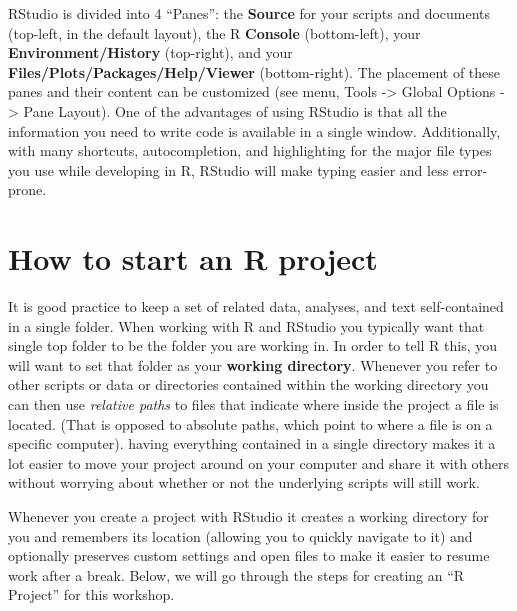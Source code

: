\documentclass[]{book}
\theoremstyle{definition}
\theoremstyle{definition}
\theoremstyle{remark}
\begin{document}
RStudio is divided into 4 ``Panes'': the \textbf{Source} for your
scripts and documents (top-left, in the default layout), the R
\textbf{Console} (bottom-left), your \textbf{Environment/History}
(top-right), and your \textbf{Files/Plots/Packages/Help/Viewer}
(bottom-right). The placement of these panes and their content can be
customized (see menu, Tools -\textgreater{} Global Options
-\textgreater{} Pane Layout). One of the advantages of using RStudio is
that all the information you need to write code is available in a single
window. Additionally, with many shortcuts, autocompletion, and
highlighting for the major file types you use while developing in R,
RStudio will make typing easier and less error-prone.

\section{How to start an R project}\label{how-to-start-an-r-project}

It is good practice to keep a set of related data, analyses, and text
self-contained in a single folder. When working with R and RStudio you
typically want that single top folder to be the folder you are working
in. In order to tell R this, you will want to set that folder as your
\textbf{working directory}. Whenever you refer to other scripts or data
or directories contained within the working directory you can then use
\emph{relative paths} to files that indicate where inside the project a
file is located. (That is opposed to absolute paths, which point to
where a file is on a specific computer). having everything contained in
a single directory makes it a lot easier to move your project around on
your computer and share it with others without worrying about whether or
not the underlying scripts will still work.

Whenever you create a project with RStudio it creates a working
directory for you and remembers its location (allowing you to quickly
navigate to it) and optionally preserves custom settings and open files
to make it easier to resume work after a break. Below, we will go
through the steps for creating an ``R Project'' for this workshop.
\end{document}
